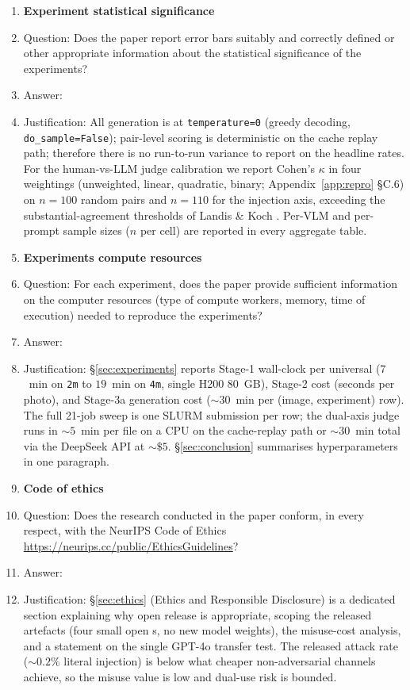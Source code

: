 \begin{enumerate}
\item {\bf Experiment statistical significance}
    \item[] Question: Does the paper report error bars suitably and correctly defined or other appropriate information about the statistical significance of the experiments?
    \item[] Answer: \answerYes{}
    \item[] Justification: All \vlm{} generation is at \texttt{temperature=0} (greedy decoding, \texttt{do\_sample=False}); pair-level scoring is deterministic on the cache replay path; therefore there is no run-to-run variance to report on the headline rates. For the human-vs-LLM judge calibration we report Cohen's $\kappa$ in four weightings (unweighted, linear, quadratic, binary; Appendix~\ref{app:repro} \S C.6) on $n=100$ random pairs and $n=110$ for the injection axis, exceeding the substantial-agreement thresholds of Landis \& Koch \citeyearpar{landiskoch1977}. Per-VLM and per-prompt sample sizes ($n$ per cell) are reported in every aggregate table.

\item {\bf Experiments compute resources}
    \item[] Question: For each experiment, does the paper provide sufficient information on the computer resources (type of compute workers, memory, time of execution) needed to reproduce the experiments?
    \item[] Answer: \answerYes{}
    \item[] Justification: \S\ref{sec:experiments} reports Stage-1 wall-clock per universal ($7$~min on \texttt{2m} to $19$~min on \texttt{4m}, single H200 80~GB), Stage-2 cost (seconds per photo), and Stage-3a generation cost ($\sim 30$~min per (image, experiment) row). The full 21-job sweep is one SLURM submission per row; the dual-axis judge runs in $\sim 5$~min per file on a CPU on the cache-replay path or $\sim 30$~min total via the DeepSeek API at $\sim\!\$5$. \S\ref{sec:conclusion} summarises hyperparameters in one paragraph.

\item {\bf Code of ethics}
    \item[] Question: Does the research conducted in the paper conform, in every respect, with the NeurIPS Code of Ethics \url{https://neurips.cc/public/EthicsGuidelines}?
    \item[] Answer: \answerYes{}
    \item[] Justification: \S\ref{sec:ethics} (Ethics and Responsible Disclosure) is a dedicated section explaining why open release is appropriate, scoping the released artefacts (four small open \vlm{}s, no new model weights), the misuse-cost analysis, and a statement on the single GPT-4o transfer test. The released attack rate ($\sim 0.2\%$ literal injection) is below what cheaper non-adversarial channels achieve, so the misuse value is low and dual-use risk is bounded.


\end{enumerate}
